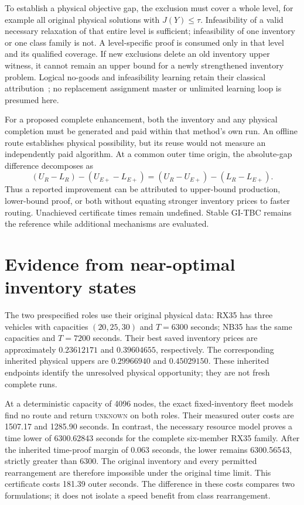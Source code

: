 \documentclass[11pt]{article}
\begin{document}
To establish a physical objective gap, the exclusion must cover a whole
level, for example all original physical solutions with $J(Y)\le\tau$.
Infeasibility of a valid necessary relaxation of that entire level is
sufficient; infeasibility of one inventory or one class family is not.
A level-specific proof is consumed only in that level and its qualified
coverage. If new exclusions delete an old inventory upper witness, it
cannot remain an upper bound for a newly strengthened inventory problem.
Logical no-goods and infeasibility learning retain their classical
attribution~\cite{hooker2003,codato2006}; no replacement assignment master
or unlimited learning loop is presumed here.

For a proposed complete enhancement, both the inventory and any physical
completion must be generated and paid within that method's own run. An
offline route establishes physical possibility, but its reuse would not
measure an independently paid algorithm. At a common outer time origin,
the absolute-gap difference decomposes as
\[
 (U_R-L_R)-(U_{E+}-L_{E+})
   =(U_R-U_{E+})-(L_R-L_{E+}).
\]
Thus a reported improvement can be attributed to upper-bound production,
lower-bound proof, or both without equating stronger inventory prices to
faster routing. Unachieved certificate times remain undefined. Stable
GI-TBC remains the reference while additional mechanisms are evaluated.

\section{Evidence from near-optimal inventory states}
The two prespecified roles use their original physical data:
RX35 has three vehicles with capacities $(20,25,30)$ and $T=6300$ seconds;
NB35 has the same capacities and $T=7200$ seconds. Their best saved
inventory prices are approximately $0.23612171$ and $0.39604655$,
respectively. The corresponding inherited physical uppers are
$0.29966940$ and $0.45029150$. These inherited endpoints identify the
unresolved physical opportunity; they are not fresh complete runs.

At a deterministic capacity of 4096 nodes, the exact fixed-inventory fleet
models find no route and return \textsc{unknown} on both roles. Their
measured outer costs are 1507.17 and 1285.90 seconds. In contrast, the
necessary resource model proves a time lower of 6300.62843 seconds for
the complete six-member RX35 family. After the inherited time-proof margin
of 0.063 seconds, the lower remains 6300.56543, strictly greater than 6300.
The original inventory and every permitted rearrangement are therefore
impossible under the original time limit. This certificate costs 181.39
outer seconds. The difference in these costs compares two formulations;
it does not isolate a speed benefit from class rearrangement.
\end{document}
